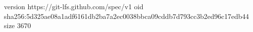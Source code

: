 version https://git-lfs.github.com/spec/v1
oid sha256:5d325ae08a1adf6161db2ba7a2ec0038bbca09cddb7d793cc3b2ed96c17edb44
size 3670
